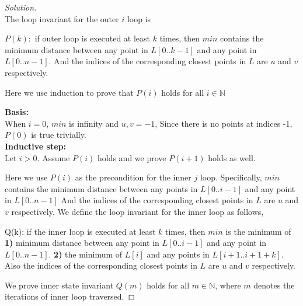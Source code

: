 \documentclass[11pt]{article}
\theoremstyle{plain}%
\theoremstyle{definition}
\theoremstyle{remark}
\newenvironment{solution}
  {\begin{proof}[Solution]}
  {\end{proof}}
\newcommand{\N}{\mathbb{N}}
\begin{document}
\begin{enumerate}
\begin{enumerate}
    \begin{solution}
      $ $\\
      The loop invariant for the outer $i$ loop is

      \begin{center}
        $P(k):$ if outer loop is executed at least $k$ times, then $min$ contains the minimum distance between any point in $L[0..k-1]$ and any point in $L[0..n-1]$. And the indices of the corresponding closest points in $L$ are $u$ and $v$ respectively.
      \end{center}

      Here we use induction to prove that $P(i)$ holds for all $i\in \N$


       \textbf{Basis:} \\
       When $i=0$, $min$ is infinity and $u,v = -1$, Since there is no points at indices -1, $P(0)$ is true trivially. \\
       \textbf{Inductive step:} \\
       Let $i>0$. Assume $P(i)$ holds and we prove $P(i+1)$ holds as well.

       Here we use $P(i)$ as the precondition for the inner $j$ loop. Specifically, $min$ contains the minimum distance between any points in $L[0..i-1]$ and any point in $L[0..n-1]$ And the indices of the corresponding closest points in $L$ are $u$ and $v$ respectively. We define the loop invariant for the inner loop as follows,

       \begin{center}
         Q(k): if the inner loop is executed at least $k$ times, then $min$ is the minimum of \textbf{1)} minimum distance between any point in $L[0..i-1]$ and any point in $L[0..n-1]$. \textbf{2)} the minimum of $L[i]$ and any points in $L[i+1..i+1+k]$. Also the indices of the corresponding closest points in $L$ are $u$ and $v$ respectively.
       \end{center}

       We prove inner state invariant $Q(m)$ holds for all $m\in \N$, where $m$ denotes the iterations of inner loop traversed.


\end{solution}
\end{enumerate}
\end{enumerate}
\end{document}
